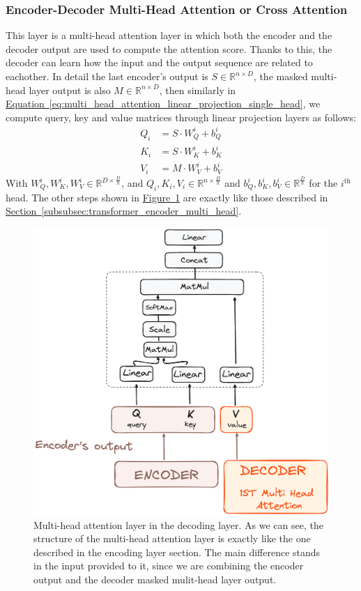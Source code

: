 \documentclass[12pt]{article}
\begin{document}
\subsubsection{Encoder-Decoder Multi-Head Attention or Cross Attention}
This layer is a multi-head attention layer in which both the encoder and the decoder output are used to 
compute the attention score. Thanks to this, the decoder can learn how the input and the output sequence are 
related to eachother. In detail the last encoder's output is $S \in \mathbb{R}^{n \times D}$, the masked multi-head layer output 
is also $M \in \mathbb{R}^{n \times D}$, then similarly in \hyperref[eq:multi_head_attention_linear_projection_single_head]{Equation~\ref*{eq:multi_head_attention_linear_projection_single_head}}, 
we compute query, key and value matrices through linear projection layers as follows:
\begin{equation}
    \begin{aligned}
        Q_i &= S \cdot W_Q^i + b_Q^i \\
        K_i &= S \cdot W_K^i + b_K^i \\
        V_i &= M \cdot W_V^i + b_V^i
    \end{aligned}
    \label{eq:decoder_multi_head_attention_linear_projection_single_head}
\end{equation}   
With $W_Q^i, W_K^i, W_V^i \in \mathbb{R}^{D \times \frac{D}{h}}$, and 
$Q_i, K_i, V_i \in \mathbb{R}^{n \times \frac{D}{h}}$ and $b_Q^i, b_K^i, b_V^i \in \mathbb{R}^{\frac{D}{h}}$
for the $i^{\text{th}}$ head. The other steps shown in 
\hyperref[fig:transformer_multi_headed_attention_layer_decoder]{Figure~\ref*{fig:transformer_multi_headed_attention_layer_decoder}}
are exactly like those described in \hyperref[subsubsec:transformer_encoder_multi_head]{Section~\ref*{subsubsec:transformer_encoder_multi_head}}.

\begin{figure}
    \centering
    \includegraphics[width=.5\textwidth]{Images/transformer_multi_headed_attention_layer_decoder.png}
    \caption{Multi-head attention layer in the decoding layer. As we can see, the structure of the multi-head attention 
    layer is exactly like the one described in the encoding layer section. The main difference stands in the input 
    provided to it, since we are combining the encoder output and the decoder masked mulit-head layer output.}
    \label{fig:transformer_multi_headed_attention_layer_decoder}
\end{figure}
\end{document}
